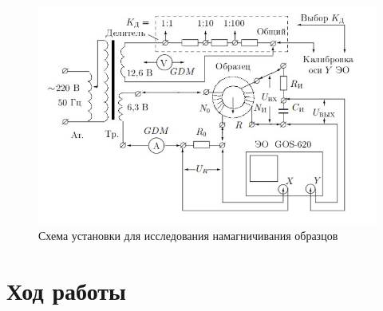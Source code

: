 \documentclass[12pt]{lab}
\begin{document}
\begin{figure}[H]
    \centering
    \includegraphics[width=\linewidth]{gist.jpg}
    \caption{Схема установки для исследования намагничивания образцов}
    \label{fig:Holl2}
\end{figure}

\section{Ход работы}
\end{document}
